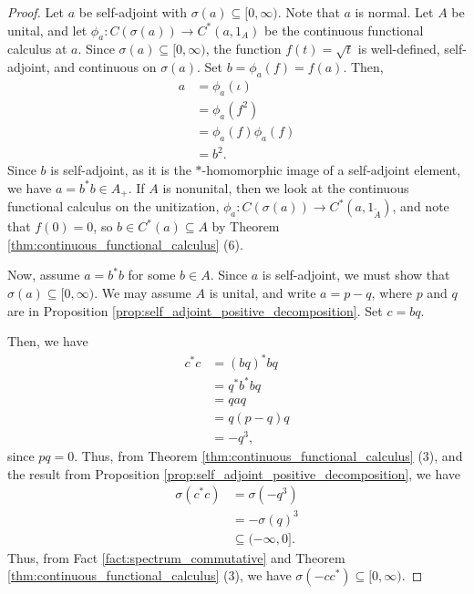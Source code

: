 \begin{proof}
  Let $a$ be self-adjoint with $\sigma\left( a \right)\subseteq [0,\infty)$. Note that $a$ is normal. Let $A$ be unital, and let $\phi_a\colon C\left( \sigma\left( a \right) \right)\rightarrow C^{\ast}\left( a,1_A \right)$ be the continuous functional calculus at $a$. Since $\sigma\left( a \right)\subseteq [0,\infty)$, the function $f\left( t \right) = \sqrt{t}$ is well-defined, self-adjoint, and continuous on $\sigma\left( a \right)$. Set $b = \phi_a\left( f \right) = f(a)$. Then,
  \begin{align*}
    a &= \phi_a\left( \iota \right)\\
      &= \phi_a\left( f^2 \right)\\
      &= \phi_a\left( f \right)\phi_a\left( f \right)\\
      &= b^2.
  \end{align*}
  Since $b$ is self-adjoint, as it is the $\ast$-homomorphic image of a self-adjoint element, we have $a = b^{\ast}b\in A_{+}$. If $A$ is nonunital, then we look at the continuous functional calculus on the unitization, $\phi_a\colon C\left( \sigma\left( a \right) \right)\rightarrow C^{\ast}\left( a,1_{\widetilde{A}} \right)$, and note that $f(0) = 0$, so $b\in C^{\ast}\left( a \right)\subseteq A$ by Theorem \ref{thm:continuous_functional_calculus} (6).\newline

  Now, assume $a = b^{\ast}b$ for some $b\in A$. Since $a$ is self-adjoint, we must show that $\sigma\left( a \right)\subseteq [0,\infty)$. We may assume $A$ is unital, and write $a = p-q$, where $p$ and $q$ are in Proposition \ref{prop:self_adjoint_positive_decomposition}. Set $c = bq$.\newline

  Then, we have
  \begin{align*}
    c^{\ast}c &= \left( bq \right)^{\ast}bq\\
              &= q^{\ast}b^{\ast}bq\\
              &= qaq\\
              &= q\left( p-q \right)q\\
              &= -q^3,
  \end{align*}
  since $pq = 0$. Thus, from Theorem \ref{thm:continuous_functional_calculus} (3), and the result from Proposition \ref{prop:self_adjoint_positive_decomposition}, we have
  \begin{align*}
    \sigma\left( c^{\ast}c \right)&=\sigma\left( -q^3 \right)\\
                                  &= -\sigma\left( q \right)^3\\
                                  &\subseteq (-\infty,0].
  \end{align*}
  Thus, from Fact \ref{fact:spectrum_commutative} and Theorem \ref{thm:continuous_functional_calculus} (3), we have $\sigma\left( -cc^{\ast} \right)\subseteq [0,\infty)$.\newline


\end{proof}
